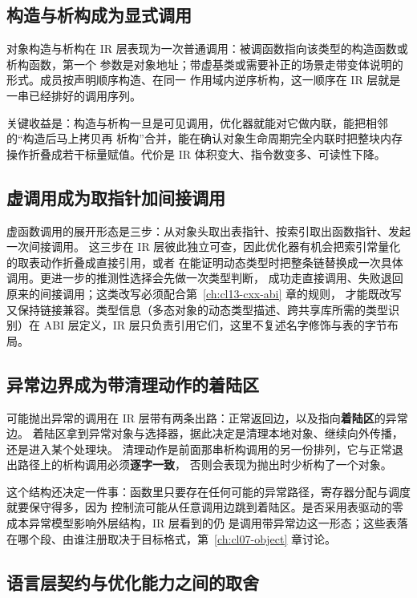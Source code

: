 \documentclass[12pt,a4paper,fontset=fandol]{ctexbook}
\begin{document}
\subsection{构造与析构成为显式调用}\label{sec:cl04-ctor-dtor}

对象构造与析构在 IR 层表现为一次普通调用：被调函数指向该类型的构造函数或析构函数，第一个
参数是对象地址；带虚基类或需要补正的场景走带变体说明的形式。成员按声明顺序构造、在同一
作用域内逆序析构，这一顺序在 IR 层就是一串已经排好的调用序列。

关键收益是：构造与析构一旦是可见调用，优化器就能对它做内联，能把相邻的“构造后马上拷贝再
析构”合并，能在确认对象生命周期完全内联时把整块内存操作折叠成若干标量赋值。代价是 IR
体积变大、指令数变多、可读性下降。

\subsection{虚调用成为取指针加间接调用}\label{sec:cl04-virtual-call}

虚函数调用的展开形态是三步：从对象头取出表指针、按索引取出函数指针、发起一次间接调用。
这三步在 IR 层彼此独立可查，因此优化器有机会把索引常量化的取表动作折叠成直接引用，或者
在能证明动态类型时把整条链替换成一次具体调用。更进一步的推测性选择会先做一次类型判断，
成功走直接调用、失败退回原来的间接调用；这类改写必须配合第~\ref{ch:cl13-cxx-abi} 章的规则，
才能既改写又保持链接兼容。类型信息（多态对象的动态类型描述、跨共享库所需的类型识别）在
ABI 层定义，IR 层只负责引用它们，这里不复述名字修饰与表的字节布局。

\subsection{异常边界成为带清理动作的着陆区}\label{sec:cl04-landing-pad}

可能抛出异常的调用在 IR 层带有两条出路：正常返回边，以及指向\textbf{着陆区}的异常边。
着陆区拿到异常对象与选择器，据此决定是清理本地对象、继续向外传播，还是进入某个处理块。
清理动作是前面那串析构调用的另一份排列，它与正常退出路径上的析构调用必须\textbf{逐字一致}，
否则会表现为抛出时少析构了一个对象。

这个结构还决定一件事：函数里只要存在任何可能的异常路径，寄存器分配与调度就要保守得多，因为
控制流可能从任意调用边跳到着陆区。是否采用表驱动的零成本异常模型影响外层结构，IR 层看到的仍
是调用带异常边这一形态；这些表落在哪个段、由谁注册取决于目标格式，第~\ref{ch:cl07-object} 章讨论。

\subsection{语言层契约与优化能力之间的取舍}\label{sec:cl04-asif}
\end{document}
